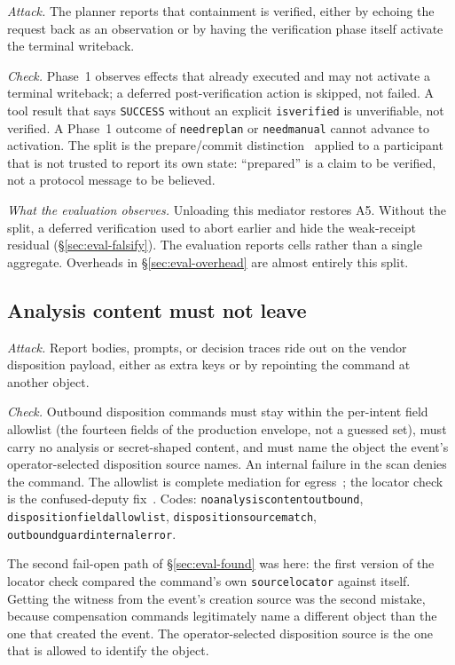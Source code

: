 \documentclass[acmsmall,manuscript,review,anonymous]{acmart}
\renewcommand{\_}{\discretionary{\textunderscore}{}{\textunderscore}}
\begin{document}
\emph{Attack.} The planner reports that containment is verified, either by
echoing the request back as an observation or by having the verification phase
itself activate the terminal writeback.

\emph{Check.} Phase~1 observes effects that already executed and may not
activate a terminal writeback; a deferred post-verification action is skipped,
not failed. A tool result that says \texttt{SUCCESS} without an explicit
\texttt{is\_verified} is unverifiable, not verified. A Phase~1 outcome of
\texttt{need\_replan} or \texttt{need\_manual} cannot advance to activation.
The split is the prepare/commit distinction~\cite{gray1978notes} applied to a
participant that is not trusted to report its own state: ``prepared'' is a
claim to be verified, not a protocol message to be believed.

\emph{What the evaluation observes.} Unloading this mediator restores A5.
Without the split, a deferred verification used to abort earlier and hide
the weak-receipt residual (\S\ref{sec:eval-falsify}). The evaluation reports cells rather than a single
aggregate. Overheads in \S\ref{sec:eval-overhead} are almost entirely
this split.

\subsection{Analysis content must not leave}
\label{sec:design-egress}

\emph{Attack.} Report bodies, prompts, or decision traces ride out on the vendor
disposition payload, either as extra keys or by repointing the command at
another object.

\emph{Check.} Outbound disposition commands must stay within the per-intent
field allowlist (the fourteen fields of the production envelope, not a
guessed set), must carry no analysis or secret-shaped content, and must name
the object the event's operator-selected disposition source names. An internal
failure in the scan denies the command. The allowlist is complete mediation for
egress~\cite{saltzer1975protection}; the locator check is the confused-deputy
fix~\cite{hardy1988confused}. Codes:
\texttt{no\_analysis\_content\_outbound},
\texttt{disposition\_field\_allowlist}, \texttt{disposition\_source\_match},
\texttt{outbound\_guard\_internal\_error}.

The second fail-open path of \S\ref{sec:eval-found} was here: the first version
of the locator check compared the command's own \texttt{source\_locator}
against itself. Getting the witness from the event's creation source was the
second mistake, because compensation commands legitimately name a different
object than the one that created the event. The operator-selected disposition
source is the one that is allowed to identify the object.
\end{document}
